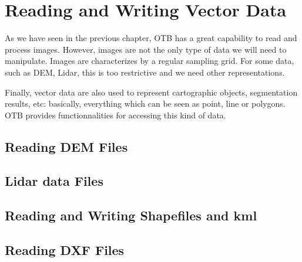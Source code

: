 \chapter{Reading and Writing Vector Data}
\label{sec:ReadingVectorData}

As we have seen in the previous chapter, OTB has a great capability to
read and process images. However, images are not the only type of data
we will need to manipulate. Images are characterizes by a regular sampling
grid. For some data, such as DEM, Lidar, this is too restrictive and we need
other representations.

Finally, vector data are also used to represent cartographic objects,
segmentation results, etc: basically, everything which can be seen as point,
line or polygons. OTB provides functionnalities for accessing this kind of data.

\section{Reading DEM Files}
\label{sec:ReadDEM}


\section{Lidar data Files}
\label{sec:ReadLidar}



\section{Reading and Writing Shapefiles and kml}
\label{sec:ReadVectorData}


\section{Reading DXF Files}
\label{sec:ReadDXF}

